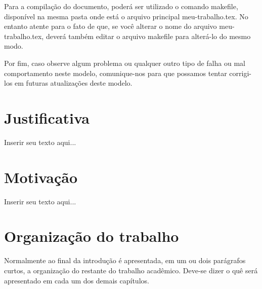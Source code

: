 Para a compilação do documento, poderá ser utilizado o comando {\ttfamily makefile}, disponível na mesma pasta onde está o arquivo principal {\ttfamily meu-trabalho.tex}.
No entanto atente para o fato de que, se você alterar o nome do arquivo {\ttfamily meu-trabalho.tex}, deverá também editar o arquivo {\ttfamily makefile} para alterá-lo do mesmo modo.

Por fim, caso observe algum problema ou qualquer outro tipo de falha ou mal comportamento neste modelo, comunique-nos para que possamos tentar corrigi-los em futuras atualizações deste modelo.

\section{Justificativa}
\label{sec:justificativa}

Inserir seu texto aqui...

\section{Motivação}
\label{sec:motivacao}

Inserir seu texto aqui...

\section{Organização do trabalho}
\label{sec:organizacao_trabalho}

Normalmente ao final da introdução é apresentada, em um ou dois parágrafos curtos, a organização do restante do trabalho acadêmico.
Deve-se dizer o quê será apresentado em cada um dos demais capítulos.
